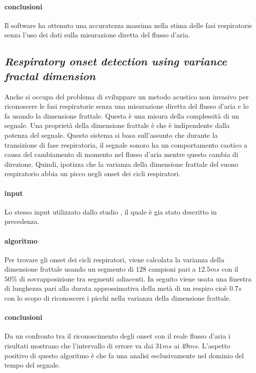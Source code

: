 \begin{frame}
    \paragraph{conclusioni}
      Il software ha ottenuto una accuratezza massima nella stima delle fasi respiratorie senza l'uso dei dati sulla misurazione diretta del flusso d'aria.



\subsection[Respiratory onset detection using variance fractal dimension]{\textit{Respiratory onset detection using variance fractal dimension} \cite{RSDUVFD}} 

  Anche \cite{RSDUVFD} si occupa del problema di sviluppare un metodo acustico non invasivo per riconoscere le fasi respiratorie senza una misurazione diretta del flusso d'aria e lo fa usando la dimensione frattale. 
  Questa \`e una misura della complessit\`a di un segnale. 
  Una propriet\`a della dimensione frattale \`e che \`e indipendente dalla potenza del segnale. 
  Questo sistema si basa sull'assunto che durante la transizione di fase respiratoria, il segnale sonoro ha un comportamento caotico a causa del cambiamento di momento nel flusso d'aria mentre questo cambia di direzione. 
  Quindi, ipotizza che la varianza della dimensione frattale del suono respiratorio abbia un picco negli onset dei cicli respiratori.
  \paragraph{input} 
    Lo stesso input utilizzato dallo studio \cite{CARPDWAM}, il quale \`e gia stato descritto in precedenza.
  \paragraph{algoritmo}
    Per trovare gli onset dei cicli respiratori, viene calcolata la varianza della dimensione frattale usando un segmento di $128$ campioni pari a $12.5ms$ con il $50\%$ di sovrapposizione tra segmenti adiacenti. 
    In seguito viene usata una finestra di lunghezza pari alla durata approssimativa della met\`a di un respiro cio\`e $0.7s$ con lo scopo di riconoscere i picchi nella varianza della dimensione frattale.
  \paragraph{conclusioni}
     Da un confronto tra il riconoscimento degli onset con il reale flusso d'aria i risultati mostrano che l'intervallo di errore va dai $31ms$ ai $49ms$. L'aspetto positivo di questo algoritmo \`e che fa una analisi esclusivamente nel dominio del tempo del segnale.



\end{frame}
